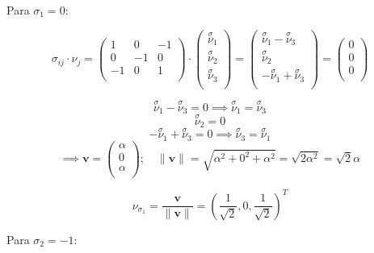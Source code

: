 \documentclass[a4paper,12pt,twoside,final,spanish]{article}
\begin{document}
Para $\sigma_{1}=0$:

\[
\sigma_{ij}\cdot\nu_{j}=
\left(\begin{matrix}
1 & 0 & -1 \\
0 & -1 & 0 \\
-1 & 0 & 1 \\
\end{matrix}\right)\cdot
\left(\begin{matrix}
\stackrel \sigma \nu_{1} \\
\stackrel \sigma \nu_{2} \\
\stackrel \sigma \nu_{3} \\
\end{matrix}\right)
=
\left(\begin{matrix}
\stackrel \sigma \nu_{1}-\stackrel \sigma \nu_{3} \\
\stackrel \sigma \nu_{2} \\
-\stackrel \sigma \nu_{1}+\stackrel \sigma \nu_{3} \\
\end{matrix}\right)
=
\left(\begin{matrix}
0 \\
0 \\
0 \\
\end{matrix}\right)
\]

\[
\stackrel \sigma \nu_{1}-\stackrel \sigma \nu_{3}=0
\implies \stackrel \sigma \nu_{1}=\stackrel \sigma \nu_{3}
\]
\[
\stackrel \sigma \nu_{2}=0
\]
\[
-\stackrel \sigma \nu_{1}+\stackrel \sigma \nu_{3}=0
\implies \stackrel \sigma \nu_{3}=\stackrel \sigma \nu_{1}
\]
\[
\implies
\mathbf{v}=\left(\begin{matrix}
\alpha \\
0 \\
\alpha \\
\end{matrix}\right);\quad
\|\mathbf{v}\|
=\sqrt{\alpha^2+0^2+\alpha^2}=\sqrt{2\alpha^2}=\sqrt{2}\alpha
\]

\[
\nu_{\sigma_{1}}=\frac{\mathbf{v}}{\|\mathbf{v}\|}
=
\left(\frac{1}{\sqrt{2}},0,\frac{1}{\sqrt{2}}\right)^{T}
\]

Para $\sigma_{2}=-1$:
\end{document}

